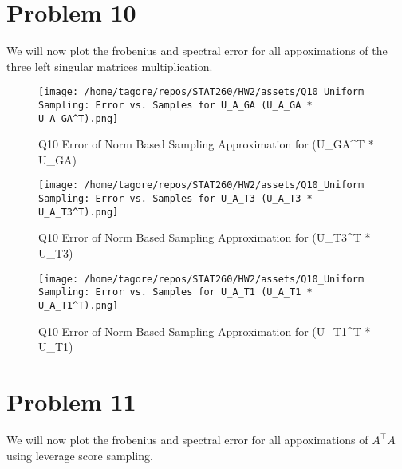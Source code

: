 \documentclass{article}
\begin{document}
\newpage
\section*{Problem 10}
We will now plot the frobenius and spectral error for all appoximations of the three left singular matrices multiplication.
\begin{figure}
    \centering
    \texttt{[image: /home/tagore/repos/STAT260/HW2/assets/Q10\_Uniform Sampling: Error vs. Samples for U\_A\_GA (U\_A\_GA * U\_A\_GA^T).png]}
    \caption{Q10 Error of Norm Based Sampling Approximation for (U\_GA\textasciicircum T * U\_GA)}
    \label{fig:T1_norm_based_prob}
\end{figure}
\begin{figure}
    \centering
    \texttt{[image: /home/tagore/repos/STAT260/HW2/assets/Q10\_Uniform Sampling: Error vs. Samples for U\_A\_T3 (U\_A\_T3 * U\_A\_T3^T).png]}
    \caption{Q10 Error of Norm Based Sampling Approximation for (U\_T3\textasciicircum T * U\_T3)}
    \label{fig:T1_norm_based_prob}
\end{figure}
\begin{figure}
    \centering
    \texttt{[image: /home/tagore/repos/STAT260/HW2/assets/Q10\_Uniform Sampling: Error vs. Samples for U\_A\_T1 (U\_A\_T1 * U\_A\_T1^T).png]}
    \caption{Q10 Error of Norm Based Sampling Approximation for (U\_T1\textasciicircum T * U\_T1)}
    \label{fig:T1_norm_based_prob}
\end{figure}

\newpage
\section*{Problem 11}
We will now plot the frobenius and spectral error for all appoximations of $A^\top A$ using leverage score sampling.

\end{document}
